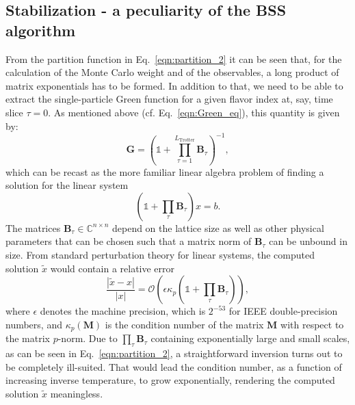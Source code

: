 %
\subsection{Stabilization - a peculiarity of the BSS algorithm}\label{sec:stable}
%
From the partition function in Eq.~\eqref{eqn:partition_2} it can be seen that, for the calculation of the Monte Carlo weight and of the observables, a long product of matrix exponentials has to be formed.
In addition to that, we need to be able to extract the single-particle Green function  for a given flavor index at, say, time slice $\tau = 0$.  As  mentioned above (cf. Eq.~\eqref{eqn:Green_eq}), this quantity is given by: 
\begin{equation}
\bm{G}= \left( \mathds{1} + \prod_{ \tau= 1}^{L_{\text{Trotter}}} \bm{B}_\tau \right)^{-1},
\end{equation}
which can be recast as the more familiar linear algebra problem of finding a solution for the linear system
\begin{equation}
\left(\mathds{1} + \prod_\tau \bm{B}_\tau\right) x = b.
\end{equation}
The matrices $\bm{B}_\tau \in \mathbb{C}^{n\times n}$ depend on the lattice size as well as other physical parameters that can be chosen such that a matrix norm of $\bm{B}_\tau$ can be unbound in size.
From standard perturbation theory for linear systems, the computed solution $\tilde{x}$ would 
contain a relative error
\begin{equation}
\frac{|\tilde{x} - x|}{|x|} = \mathcal{O}\left(\epsilon \kappa_p\left(\mathds{1} + \prod_\tau \bm{B}_\tau\right)\right),
\end{equation}
where $\epsilon$ denotes the machine precision, which is $2^{-53}$ for IEEE double-precision numbers, and $\kappa_p(\bm{M})$ is the condition number of the matrix $\bm{M}$ with respect to the matrix $p$-norm. Due to $\prod_ \tau \bm{B}_\tau$ containing exponentially large and small scales, as can be seen in Eq.~\eqref{eqn:partition_2}, a straightforward inversion turns out to be completely ill-suited. That would lead the condition number, as a function of increasing inverse temperature, to grow exponentially, rendering the computed solution $\tilde{x}$ meaningless.

